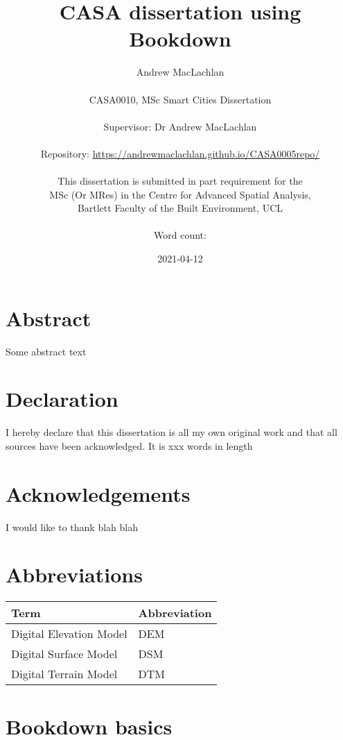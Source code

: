 \documentclass[
  12pt,
  oneside]{book}
\title{CASA dissertation using Bookdown}
\author{Andrew MacLachlan\\
~\\
CASA0010, MSc Smart Cities Dissertation\\
~\\
Supervisor: Dr Andrew MacLachlan\\
~\\
Repository: \url{https://andrewmaclachlan.github.io/CASA0005repo/}\\
~\\
This dissertation is submitted in part requirement for the\\
MSc (Or MRes) in the Centre for Advanced Spatial Analysis,\\
Bartlett Faculty of the Built Environment, UCL\\
~\\
Word count:}
\date{2021-04-12}
\begin{document}
\maketitle


\hypertarget{abstract}{%
\chapter*{Abstract}\label{abstract}}

Some abstract text


\hypertarget{declaration}{%
\chapter*{Declaration}\label{declaration}}

I hereby declare that this dissertation is all my own original work and that all sources have been acknowledged. It is xxx words in length

\hypertarget{acknowledgements}{%
\chapter*{Acknowledgements}\label{acknowledgements}}

I would like to thank blah blah

\setcounter{tocdepth}{3}
\tableofcontents
\listoffigures
\listoftables

\hypertarget{abbreviations}{%
\chapter*{Abbreviations}\label{abbreviations}}

\begin{table}[H]
\centering
\begin{tabular}{ll}
\toprule
\textbf{Term} & \textbf{Abbreviation}\\
\midrule
Digital Elevation Model & DEM\\
Digital Surface Model & DSM\\
Digital Terrain Model & DTM\\
\bottomrule
\end{tabular}
\end{table}

\hypertarget{bookdown-basics}{%
\chapter{Bookdown basics}\label{bookdown-basics}}
\end{document}
